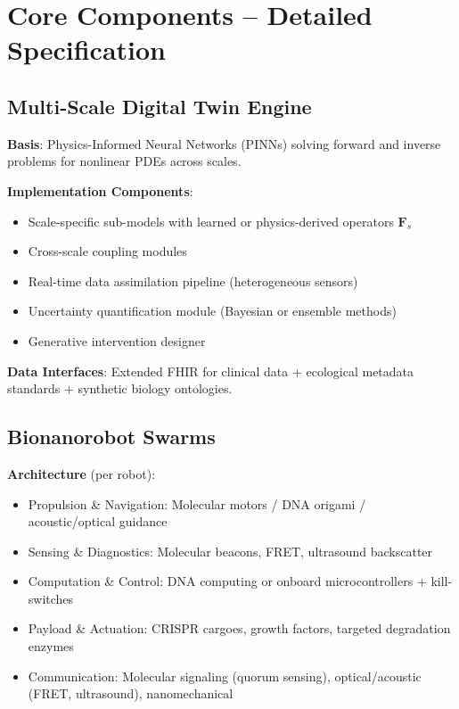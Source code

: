 \documentclass[11pt,a4paper]{report}
\begin{document}
\chapter{Core Components -- Detailed Specification}

\section{Multi-Scale Digital Twin Engine}

\textbf{Basis}: Physics-Informed Neural Networks (PINNs) solving forward and inverse problems for nonlinear PDEs across scales.

\textbf{Implementation Components}:
\begin{itemize}
    \item Scale-specific sub-models with learned or physics-derived operators $\mathbf{F}_s$
    \item Cross-scale coupling modules
    \item Real-time data assimilation pipeline (heterogeneous sensors)
    \item Uncertainty quantification module (Bayesian or ensemble methods)
    \item Generative intervention designer
\end{itemize}

\textbf{Data Interfaces}: Extended FHIR for clinical data + ecological metadata standards + synthetic biology ontologies.

\section{Bionanorobot Swarms}

\textbf{Architecture} (per robot):
\begin{itemize}
    \item Propulsion \& Navigation: Molecular motors / DNA origami / acoustic/optical guidance
    \item Sensing \& Diagnostics: Molecular beacons, FRET, ultrasound backscatter
    \item Computation \& Control: DNA computing or onboard microcontrollers + kill-switches
    \item Payload \& Actuation: CRISPR cargoes, growth factors, targeted degradation enzymes
    \item Communication: Molecular signaling (quorum sensing), optical/acoustic (FRET, ultrasound), nanomechanical
\end{itemize}
\end{document}
